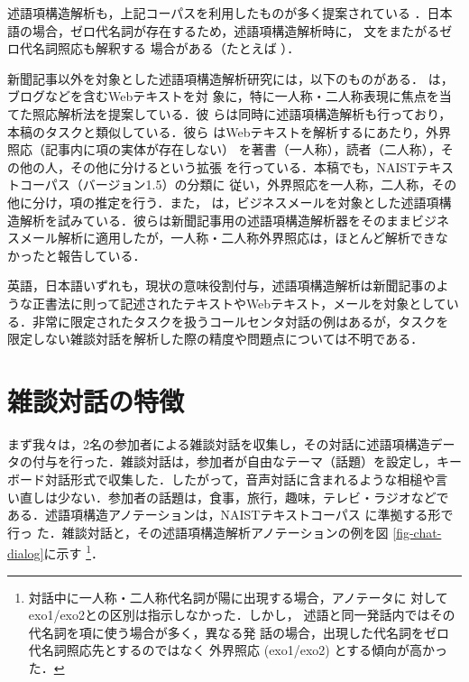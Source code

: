 \documentclass[japanese]{jnlp_1.4}
\begin{document}
述語項構造解析も，上記コーパスを利用したものが多く提案されている
\cite{Komachi:PredArgs2007,taira-fujita-nagata:2008:EMNLP,imamura-saito-izumi:2009:Short,Yoshikawa:PredArgs2013j,Hayashibe:PredArgs2014j}．日本語の場合，ゼロ代名詞が存在するため，述語項構造解析時に，
文をまたがるゼロ代名詞照応も解釈する
場合がある（たとえば
\cite{taira-fujita-nagata:2008:EMNLP,imamura-saito-izumi:2009:Short,Hayashibe:PredArgs2014j}）．

新聞記事以外を対象とした述語項構造解析研究には，以下のものがある．
は，ブログなどを含むWebテキストを対
象に，特に一人称・二人称表現に焦点を当てた照応解析法を提案している．彼
らは同時に述語項構造解析も行っており，本稿のタスクと類似している．彼ら
はWebテキストを解析するにあたり，外界照応（記事内に項の実体が存在しない）
を著書（一人称），読者（二人称），その他の人，その他に分けるという拡張
を行っている．本稿でも，NAISTテキストコーパス（バージョン1.5）の分類に
従い，外界照応を一人称，二人称，その他に分け，項の推定を行う．また，
 は，ビジネスメールを対象とした述語項構
造解析を試みている．彼らは新聞記事用の述語項構造解析器をそのままビジネ
スメール解析に適用したが，一人称・二人称外界照応は，ほとんど解析できな
かったと報告している．

英語，日本語いずれも，現状の意味役割付与，述語項構造解析は新聞記事のよ
うな正書法に則って記述されたテキストやWebテキスト，メールを対象としてい
る．非常に限定されたタスクを扱うコールセンタ対話の例はあるが，タスクを
限定しない雑談対話を解析した際の精度や問題点については不明である．


\section{雑談対話の特徴}
\label{sec-char-dialogs}

まず我々は，2名の参加者による雑談対話を収集し，その対話に述語項構造デー
タの付与を行った．雑談対話は，参加者が自由なテーマ（話題）を設定し，キー
ボード対話形式で収集した．したがって，音声対話に含まれるような相槌や言
い直しは少ない．参加者の話題は，食事，旅行，趣味，テレビ・ラジオなどで
ある．述語項構造アノテーションは，NAISTテキストコーパス
\cite{iida-EtAl:2007:LAW,Iida:NAISTCorpus2010j}に準拠する形で行っ
た．雑談対話と，その述語項構造解析アノテーションの例を図
\ref{fig-chat-dialog}に示す
\footnote{対話中に一人称・二人称代名詞が陽に出現する場合，アノテータに
対してexo1/exo2との区別は指示しなかった．しかし，
述語と同一発話内ではその代名詞を項に使う場合が多く，異なる発
話の場合，出現した代名詞をゼロ代名詞照応先とするのではなく
外界照応 (exo1/exo2) とする傾向が高かった．}．
\end{document}
